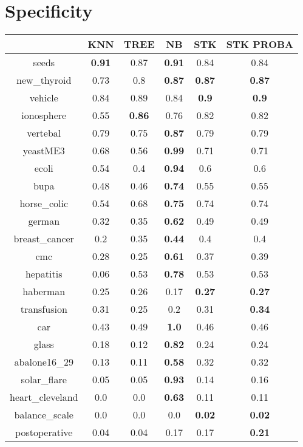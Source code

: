 \documentclass{article}%
\begin{document}
\section*{Specificity}%
\begin{tabular}{c|ccccc}%
&KNN&TREE&NB&STK&STK PROBA\\%
\hline%
seeds&\textbf{0.91}&0.87&\textbf{0.91}&0.84&0.84\\%
new\_thyroid&0.73&0.8&\textbf{0.87}&\textbf{0.87}&\textbf{0.87}\\%
vehicle&0.84&0.89&0.84&\textbf{0.9}&\textbf{0.9}\\%
ionosphere&0.55&\textbf{0.86}&0.76&0.82&0.82\\%
vertebal&0.79&0.75&\textbf{0.87}&0.79&0.79\\%
yeastME3&0.68&0.56&\textbf{0.99}&0.71&0.71\\%
ecoli&0.54&0.4&\textbf{0.94}&0.6&0.6\\%
bupa&0.48&0.46&\textbf{0.74}&0.55&0.55\\%
horse\_colic&0.54&0.68&\textbf{0.75}&0.74&0.74\\%
german&0.32&0.35&\textbf{0.62}&0.49&0.49\\%
breast\_cancer&0.2&0.35&\textbf{0.44}&0.4&0.4\\%
cmc&0.28&0.25&\textbf{0.61}&0.37&0.39\\%
hepatitis&0.06&0.53&\textbf{0.78}&0.53&0.53\\%
haberman&0.25&0.26&0.17&\textbf{0.27}&\textbf{0.27}\\%
transfusion&0.31&0.25&0.2&0.31&\textbf{0.34}\\%
car&0.43&0.49&\textbf{1.0}&0.46&0.46\\%
glass&0.18&0.12&\textbf{0.82}&0.24&0.24\\%
abalone16\_29&0.13&0.11&\textbf{0.58}&0.32&0.32\\%
solar\_flare&0.05&0.05&\textbf{0.93}&0.14&0.16\\%
heart\_cleveland&0.0&0.0&\textbf{0.63}&0.11&0.11\\%
balance\_scale&0.0&0.0&0.0&\textbf{0.02}&\textbf{0.02}\\%
postoperative&0.04&0.04&0.17&0.17&\textbf{0.21}\\%
\end{tabular}

%
\end{document}
